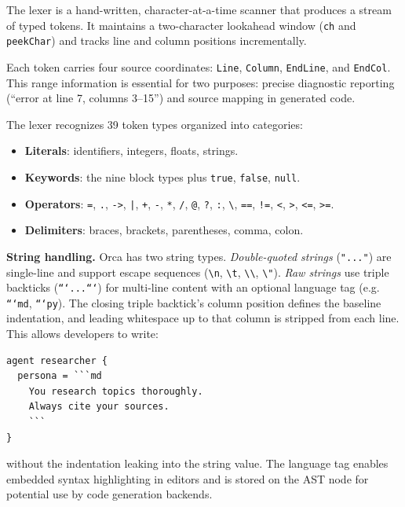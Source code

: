 \documentclass[sigconf,nonacm]{acmart}
\begin{document}
The lexer is a hand-written, character-at-a-time scanner that produces a
stream of typed tokens. It maintains a two-character lookahead window
(\texttt{ch} and \texttt{peekChar}) and tracks line and column positions
incrementally.

Each token carries four source coordinates: \texttt{Line}, \texttt{Column},
\texttt{EndLine}, and \texttt{EndCol}. This range information is essential
for two purposes: precise diagnostic reporting (``error at line 7, columns
3--15'') and source mapping in generated code.

The lexer recognizes 39 token types organized into categories:

\begin{itemize}[leftmargin=*]
  \item \textbf{Literals}: identifiers, integers, floats, strings.
  \item \textbf{Keywords}: the nine block types plus \texttt{true},
        \texttt{false}, \texttt{null}.
  \item \textbf{Operators}: \texttt{=}, \texttt{.}, \texttt{->},
        \texttt{|}, \texttt{+}, \texttt{-}, \texttt{*}, \texttt{/},
        \texttt{@}, \texttt{?}, \texttt{:}, \texttt{\textbackslash},
        \texttt{==}, \texttt{!=}, \texttt{<}, \texttt{>},
        \texttt{<=}, \texttt{>=}.
  \item \textbf{Delimiters}: braces, brackets, parentheses, comma, colon.
\end{itemize}

\noindent\textbf{String handling.} Orca has two string types.
\emph{Double-quoted strings} (\texttt{"..."}) are single-line and support
escape sequences (\texttt{\textbackslash n}, \texttt{\textbackslash t},
\texttt{\textbackslash\textbackslash}, \texttt{\textbackslash"}).
\emph{Raw strings} use triple backticks (\texttt{```...```}) for
multi-line content with an optional language tag (e.g.
\texttt{```md}, \texttt{```py}). The closing triple backtick's column
position defines the baseline indentation, and leading whitespace up to
that column is stripped from each line. This allows developers to write:

\begin{lstlisting}
agent researcher {
  persona = ```md
    You research topics thoroughly.
    Always cite your sources.
    ```
}
\end{lstlisting}

\noindent without the indentation leaking into the string value. The
language tag enables embedded syntax highlighting in editors and is
stored on the AST node for potential use by code generation backends.
\end{document}
